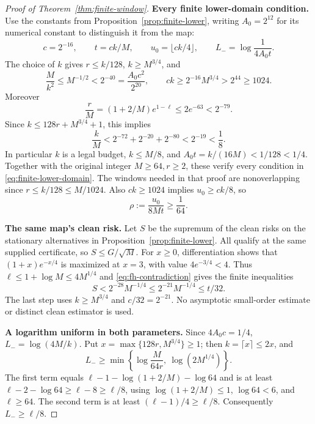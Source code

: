 \begin{proof}[Proof of Theorem~\ref{thm:finite-window}]
\noindent\textbf{Every finite lower-domain condition.}
Use the constants from Proposition~\ref{prop:finite-lower}, writing
$A_0=2^{12}$ for its numerical constant to distinguish it from the map:
\[
 c=2^{-16},\qquad t=ck/M,\qquad
 u_0=\lfloor ck/4\rfloor,\qquad
 L_-=\log\frac1{4A_0t}.
\]
The choice of $k$ gives $r\le k/128$, $k\ge M^{3/4}$, and
\[
 \frac M{k^2}\le M^{-1/2}<2^{-40}
   =\frac{A_0c^2}{2^{20}},\qquad
 ck\ge2^{-16}M^{3/4}>2^{44}\ge1024.
\]
Moreover
\[
 \frac rM=(1+2/M)e^{1-\ell}\le2e^{-63}<2^{-79}.
\]
Since $k\le128r+M^{3/4}+1$, this implies
\[
 \frac kM<2^{-72}+2^{-20}+2^{-80}<2^{-19}<\frac18.
\]
In particular $k$ is a legal budget, $k\le M/8$, and
$A_0t=k/(16M)<1/128<1/4$. Together with the original integer
$M\ge64,r\ge2$, these verify every condition in
\eqref{eq:finite-lower-domain}. The windows needed in that proof are
nonoverlapping since $r\le k/128\le M/1024$.
Also $ck\ge1024$ implies $u_0\ge ck/8$, so
\begin{equation}\label{eq:fh-prefactor}
 \rho:=\frac{u_0}{8Mt}\ge\frac1{64}.
\end{equation}

\noindent\textbf{The same map's clean risk.}
Let $S$ be the supremum of the clean risks on the stationary alternatives
in Proposition~\ref{prop:finite-lower}. All qualify at the same supplied
certificate, so $S\le G/\sqrt M$. For $x\ge0$, differentiation shows
that $(1+x)e^{-x/4}$ is maximized at $x=3$, with value
$4e^{-3/4}<4$. Thus $\ell\le1+\log M\le4M^{1/4}$ and
\eqref{eq:fh-contradiction} gives the finite inequalities
\begin{equation}\label{eq:fh-clean}
 S<2^{-28}M^{-1/4}\le2^{-21}M^{-1/4}\le t/32.
\end{equation}
The last step uses $k\ge M^{3/4}$ and $c/32=2^{-21}$.
No asymptotic small-order estimate or distinct clean estimator is used.

\noindent\textbf{A logarithm uniform in both parameters.}
Since $4A_0c=1/4$, $L_-=\log(4M/k)$. Put
$x=\max\{128r,M^{3/4}\}\ge1$; then $k=\lceil x\rceil\le2x$, and
\[
 L_-\ge\min\left\{\log\frac M{64r},\ \log(2M^{1/4})\right\}.
\]
The first term equals
$\ell-1-\log(1+2/M)-\log64$ and is at least
$\ell-2-\log64\ge\ell-8\ge\ell/8$, using
$\log(1+2/M)\le1$, $\log64<6$, and $\ell\ge64$.
The second term is at least $(\ell-1)/4\ge\ell/8$.
Consequently $L_-\ge\ell/8$.


\end{proof}
